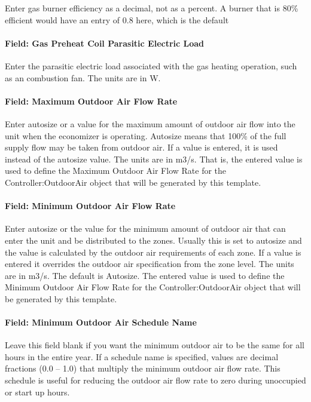 Enter gas burner efficiency as a decimal, not as a percent. A burner that is 80\% efficient would have an entry of 0.8 here, which is the default

\paragraph{Field: Gas Preheat Coil Parasitic Electric Load}\label{field-gas-preheat-coil-parasitic-electric-load-1}

Enter the parasitic electric load associated with the gas heating operation, such as an combustion fan. The units are in W.

\paragraph{Field: Maximum Outdoor Air Flow Rate}\label{field-maximum-outdoor-air-flow-rate-5}

Enter autosize or a value for the maximum amount of outdoor air flow into the unit when the economizer is operating. Autosize means that 100\% of the full supply flow may be taken from outdoor air. If a value is entered, it is used instead of the autosize value. The units are in m3/s. That is, the entered value is used to define the Maximum Outdoor Air Flow Rate for the Controller:OutdoorAir object that will be generated by this template.

\paragraph{Field: Minimum Outdoor Air Flow Rate}\label{field-minimum-outdoor-air-flow-rate-5}

Enter autosize or the value for the minimum amount of outdoor air that can enter the unit and be distributed to the zones. Usually this is set to autosize and the value is calculated by the outdoor air requirements of each zone. If a value is entered it overrides the outdoor air specification from the zone level. The units are in m3/s. The default is Autosize. The entered value is used to define the Minimum Outdoor Air Flow Rate for the Controller:OutdoorAir object that will be generated by this template.

\paragraph{Field: Minimum Outdoor Air Schedule Name}\label{field-minimum-outdoor-air-schedule-name-4}

Leave this field blank if you want the minimum outdoor air to be the same for all hours in the entire year. If a schedule name is specified, values are decimal fractions (0.0 -- 1.0) that multiply the minimum outdoor air flow rate. This schedule is useful for reducing the outdoor air flow rate to zero during unoccupied or start up hours.

